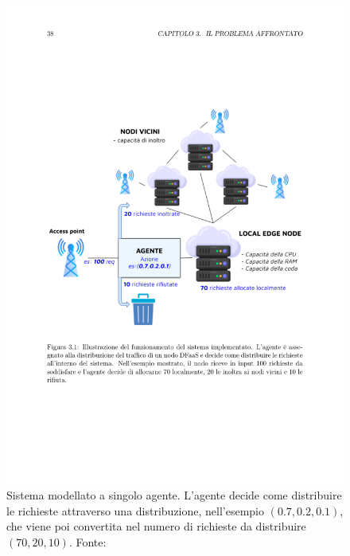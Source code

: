 \begin{figure}
    \centering
    \includegraphics[width=.8\linewidth]{assets/3/single_agent_env.pdf}
    \caption[Sistema modellato a singolo agente.]{Sistema modellato a singolo agente. L'agente decide come distribuire le richieste attraverso una distribuzione, nell'esempio $(0.7, 0.2, 0.1)$, che viene poi convertita nel numero di richieste da distribuire $(70, 20, 10)$. Fonte: \cite{Petriglia2024}}
    \label{fig:2_single_agent_env}
\end{figure}